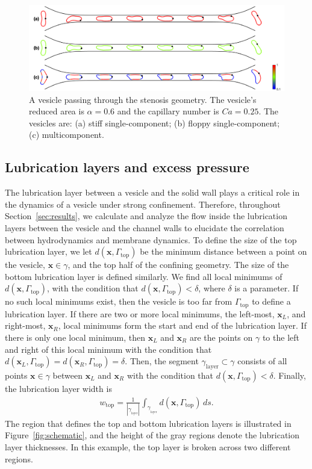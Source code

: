 \documentclass[twoside,twocolumn,9pt]{article}
\newcommand{\xx}{\mathbf{x}}
\begin{document}
\begin{figure}[h]
  \centering
  \includegraphics[width=0.9\linewidth]{figures/STENOSIS_RAp6MCp5.pdf}
  \caption{\label{fig:RA6} \small A vesicle passing through the stenosis
  geometry. The vesicle's reduced area is $\alpha = 0.6$ and the
  capillary number is $Ca = 0.25$. The vesicles are: (a) stiff
  single-component; (b) floppy single-component; (c) multicomponent.}
\end{figure}


\subsection{\label{sec:LL} Lubrication layers and excess pressure}
The lubrication layer between a vesicle and the solid wall plays a
critical role in the dynamics of a vesicle under strong confinement.
Therefore, throughout Section~\ref{sec:results}, we calculate and
analyze the flow inside the lubrication layers between the vesicle and
the channel walls to elucidate the correlation between hydrodynamics and
membrane dynamics. To define the size of the top lubrication layer, we
let $d(\xx,\Gamma_\mathrm{top})$ be the minimum distance between a point
on the vesicle, $\xx \in \gamma$, and the top half of the confining
geometry. The size of the bottom lubrication layer is defined similarly.
We find all local minimums of $d(\xx,\Gamma_\mathrm{top})$, with the
condition that $d(\xx,\Gamma_\mathrm{top}) < \delta$, where $\delta$ is
a parameter. If no such local minimums exist, then the vesicle is too
far from $\Gamma_\mathrm{top}$ to define a lubrication layer. If there
are two or more local minimums, the left-most, $\xx_L$, and right-most,
$\xx_R$, local minimums form the start and end of the lubrication layer.
If there is only one local minimum, then $\xx_L$ and $\xx_R$ are the
points on $\gamma$ to the left and right of this local minimum with the
condition that $d(\xx_L,\Gamma_\mathrm{top}) =
d(\xx_R,\Gamma_\mathrm{top}) = \delta$. Then, the segment
$\gamma_{\mathrm{layer}} \subset \gamma$ consists of all points $\xx \in
\gamma$ between $\xx_L$ and $\xx_R$ with the condition that
$d(\xx,\Gamma_\mathrm{top}) < \delta$. Finally, the lubrication layer
width is
\begin{align}
  w_\mathrm{top} = \frac{1}{|\gamma_{_\mathrm{layer}}|} 
    \int_{\gamma_{_\mathrm{layer}}} d(\xx,\Gamma_\mathrm{top}) \, ds.
\end{align}
The region that defines the top and bottom lubrication layers is
illustrated in Figure~\ref{fig:schematic}, and the height of the gray
regions denote the lubrication layer thicknesses. In this example, the
top layer is broken across two different regions.
\end{document}
